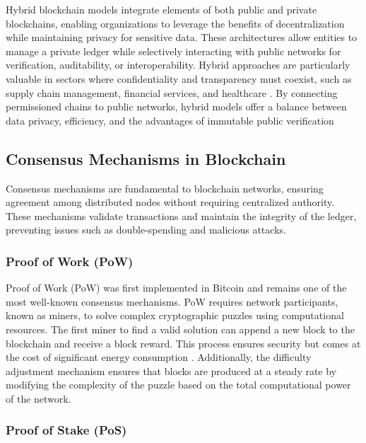 \documentclass{article}
\begin{document}
Hybrid blockchain models integrate elements of both public and private blockchains, enabling organizations to leverage the benefits of decentralization while maintaining privacy for sensitive data. These architectures allow entities to manage a private ledger while selectively interacting with public networks for verification, auditability, or interoperability. Hybrid approaches are particularly valuable in sectors where confidentiality and transparency must coexist, such as supply chain management, financial services, and healthcare \cite{ahmed20222}. By connecting permissioned chains to public networks, hybrid models offer a balance between data privacy, efficiency, and the advantages of immutable public verification

\subsection{Consensus Mechanisms in Blockchain}

Consensus mechanisms are fundamental to blockchain networks, ensuring agreement among distributed nodes without requiring centralized authority. These mechanisms validate transactions and maintain the integrity of the ledger, preventing issues such as double-spending and malicious attacks.

\subsubsection{Proof of Work (PoW)}

Proof of Work (PoW) was first implemented in Bitcoin \cite{nakamoto2008bitcoin} and remains one of the most well-known consensus mechanisms. PoW requires network participants, known as miners, to solve complex cryptographic puzzles using computational resources. The first miner to find a valid solution can append a new block to the blockchain and receive a block reward. This process ensures security but comes at the cost of significant energy consumption \cite{narayanan2016bitcoin, sedlmeir_energy_2020}. Additionally, the difficulty adjustment mechanism ensures that blocks are produced at a steady rate by modifying the complexity of the puzzle based on the total computational power of the network.

\subsubsection{Proof of Stake (PoS)}
\end{document}
